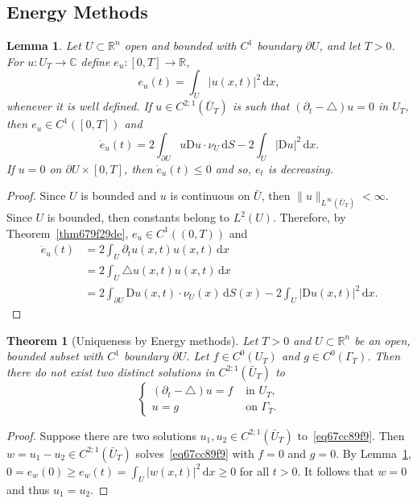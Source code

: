 \documentclass[a4paper,9pt]{amsart}
\newcommand{\R}{\mathbb{R}}	%
\newcommand{\C}{\mathbb{C}}	%
\newcommand{\did}{\,\mathrm{d}}	%
\newcommand{\de}{\partial}		%
\newcommand{\Diff}{\mathrm{D}}
\newcommand{\laplacian}{\triangle}
\theoremstyle{plain}
\newtheorem{theorem}[proposition]{Theorem}
\newtheorem{lemma}[proposition]{Lemma}
\theoremstyle{definition}
\theoremstyle{remark}
\begin{document}
\subsection{Energy Methods}
\begin{lemma}\label{lem67cc8a6c}
	Let $U\subset\R^n$ open and bounded with $C^1$ boundary $\de U$, and let $T>0$.
	For $u:U_T\to\C$ define $e_u:[0,T]\to\R$,
	\begin{equation}
		e_u(t) = \int_U |u(x,t)|^2 \did x ,
	\end{equation}
	whenever it is well defined.
	If $u\in C^{2;1}(\bar U_T)$ is such that $(\de_t-\laplacian)u=0$ in $U_T$, then $e_u\in C^1([0,T])$ and
	\begin{equation}
		\dot e_u(t) = 2 \int_{\de U} u \Diff u\cdot\nu_U \did S 
			- 2 \int_U |\Diff u|^2 \did x .
	\end{equation}
	If $u=0$ on $\de U\times [0,T]$, then $\dot e_u(t) \le 0$ and so, $e_t$ is decreasing.
\end{lemma}
\begin{proof}
	Since $U$ is bounded and $u$ is continuous on $\bar U$, then $\|u\|_{L^\infty(\bar U_T)} < \infty$.
	Since $U$ is bounded, then constants belong to $L^2(U)$.
	Therefore, by Theorem~\ref{thm679f29de}, $e_u\in C^1((0,T))$ and
	\begin{align*}
	 	\dot e_u(t) 
		&= 2\int_U \de_t u(x,t) u(x,t) \did x \\
		&= 2 \int_U \laplacian u(x,t) u(x,t) \did x \\
		&= 2 \int_{\de U} \Diff u(x,t) \cdot \nu_U(x) \did S(x)
			- 2 \int_U |\Diff u(x,t)|^2 \did x .
	\end{align*} 
\end{proof}

\begin{theorem}[Uniqueness by Energy methods]\label{thm67cc8975}
	Let $T>0$ and $U\subset\R^n$ be an open, bounded subset with $C^1$ boundary $\de U$.
	Let $f\in C^0(U_T)$ and $g\in C^0(\Gamma_T)$.
	Then there do not exist two distinct solutions in $C^{2;1}(\bar U_T)$ to
	\begin{equation}\label{eq67cc89f9}
	\begin{cases}
		(\de_t-\laplacian)u = f & \text{ in }U_T , \\
		u = g & \text{ on }\Gamma_T .
	\end{cases}
	\end{equation}
\end{theorem}
\begin{proof}
	Suppose there are two solutions $u_1,u_2\in C^{2;1}(\bar U_T)$ to~\eqref{eq67cc89f9}.
	Then $w=u_1-u_2 \in C^{2;1}(\bar U_T)$ solves~\eqref{eq67cc89f9} with $f=0$ and $g=0$.
	By Lemma~\ref{lem67cc8a6c}, $0 = e_w(0) \ge e_w(t) = \int_U |w(x,t)|^2 \did x \ge 0$ for all $t>0$.
	It follows that $w=0$ and thus $u_1=u_2$.
\end{proof}
\end{document}
